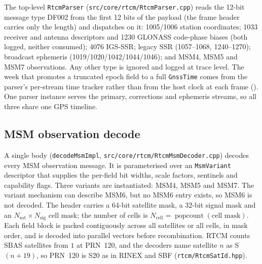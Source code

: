 \documentclass[main.tex]{subfiles}
\begin{document}
The top-level \texttt{RtcmParser} (\texttt{src/core/rtcm/RtcmParser.cpp})
reads the 12-bit message type DF002 from the first 12 bits of the
payload (the frame header carries only the length) and dispatches on it:
1005/1006 station coordinates; 1033 receiver and antenna descriptors and
1230 GLONASS code-phase biases (both logged, neither consumed); 4076
IGS-SSR; legacy SSR (1057--1068, 1240--1270); broadcast ephemeris
(1019/1020/1042/1044/1046); and MSM4, MSM5 and MSM7 observations.  Any
other type is ignored and logged at trace level.  The
week that promotes a truncated epoch field to a full \texttt{GnssTime}
comes from the parser's per-stream time tracker rather than from the
host clock at each frame ().  One parser instance
serves the primary, corrections and ephemeris streams, so all three share
one GPS timeline.

\subsection{MSM observation decode}\label{sec:rt-msm}

A single body (\texttt{decodeMsmImpl},
\texttt{src/core/rtcm/RtcmMsmDecoder.cpp}) decodes every MSM observation
message.  It is parameterised over an \texttt{MsmVariant} descriptor that
supplies the per-field bit widths, scale factors, sentinels and
capability flags.  Three variants are instantiated: MSM4, MSM5 and MSM7.
The variant mechanism can describe MSM6, but no MSM6 entry exists, so
MSM6 is not decoded.  The header carries a 64-bit satellite mask, a
32-bit signal mask and an $N_{\text{sat}}\times N_{\text{sig}}$ cell
mask; the number of cells is
$N_{\text{cell}} = \operatorname{popcount}(\text{cell mask})$.  Each
field block is packed contiguously across all satellites or all cells, in
mask order, and is decoded into parallel vectors before recombination.
RTCM counts SBAS satellites from $1$ at PRN~120, and the decoders name
satellite $n$ as S$(n+19)$, so PRN~120 is S20 as in RINEX and SBF
(\texttt{rtcm/RtcmSatId.hpp}).
\end{document}
